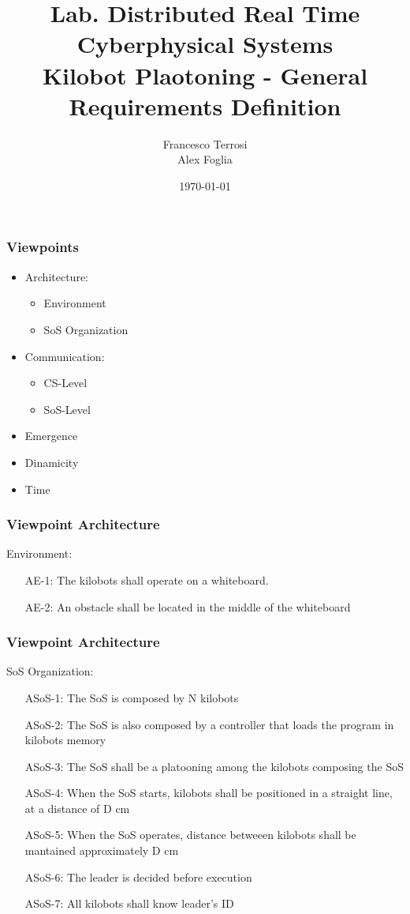 \documentclass{beamer}
\title[Kilobot Platooning - General Requirements]{Lab. Distributed Real Time Cyberphysical Systems\\Kilobot Plaotoning - General Requirements Definition} %
\author{Francesco Terrosi \\Alex Foglia} %
\institute[UNIFI] %
{
Universit\`a di Firenze \\ %
}
\date{\today} %
\begin{document}
\begin{frame}
\titlepage %
\end{frame}


\begin{frame}
\frametitle{Viewpoints}
\begin{itemize}
	\item Architecture:
	\begin{itemize}
		\item Environment
		\item SoS Organization
	\end{itemize}
	\item Communication:
	\begin{itemize}
		\item CS-Level
		\item SoS-Level
	\end{itemize}
	\item Emergence
	\item Dinamicity
	\item Time
\end{itemize}
\end{frame}

\begin{frame}
\frametitle{Viewpoint Architecture}
Environment:
	\begin{enumerate}[align=left]
		\item [AE-1:] The kilobots shall operate on a whiteboard.
		\item [AE-2:] An obstacle shall be located in the middle of the whiteboard
	\end{enumerate}
\end{frame}

\begin{frame}
\frametitle{Viewpoint Architecture}
SoS Organization:

\begin{enumerate}[align=left]
	\item[ASoS-1:] The SoS is composed by N kilobots
	\item  [ASoS-2:] The SoS is also composed by a controller that loads the program in kilobots memory
	\item [ASoS-3:] The SoS shall be a platooning among the kilobots composing the SoS
	\item [ASoS-4:] When the SoS starts, kilobots shall be positioned in a straight line, at a distance of D cm
	\item [ASoS-5:] When the SoS operates, distance betweeen kilobots shall be mantained approximately D cm
	\item [ASoS-6:] The leader is decided before execution
	\item [ASoS-7:] All kilobots shall know leader's ID
\end{enumerate}
\end{frame}
\end{document}

